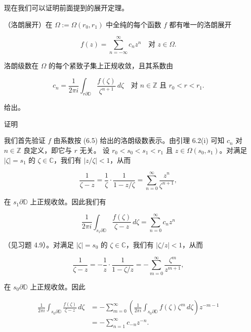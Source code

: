 现在我们可以证明前面提到的展开定理。

\begin{theorem}

（洛朗展开）在 $ \Omega := \Omega(r_{0},r_{1}) $ 中全纯的每个函数 $ f $ 都有唯一的洛朗展开

\begin{equation}
f(z) = \sum_{n=-\infty}^{\infty} c_{n}z^{n} \quad\text{对 } z \in \Omega .\tag{6.4}
\end{equation}

洛朗级数在 $ \Omega $ 的每个紧致子集上正规收敛，且其系数由

\begin{equation}
c_{n} = \frac{1}{2\pi i}\int_{r\partial\mathbb{D}}\frac{f(\zeta)}{\zeta^{n+1}}\,d\zeta \quad\text{对 } n \in \mathbb{Z} \text{ 且 } r_{0} < r < r_{1} .\tag{6.5}
\end{equation}

给出。

证明

\begin{subitems}
\item

我们首先验证 $ f $ 由系数按 (6.5) 给出的洛朗级数表示。由引理 6.2(i) 可知 $ c_{n} $ 对 $ n \in \mathbb{Z} $ 良定义，即它与 $ r $ 无关。
设 $ r_{0} < s_{0} < s_{1} < r_{1} $ 且 $ z \in \Omega(s_{0},s_{1}) $。对满足 $ |\zeta| = s_{1} $ 的 $ \zeta \in \mathbb{C} $，我们有 $ |z/\zeta| < 1 $，从而

\[
\frac{1}{\zeta - z} = \frac{1}{\zeta}\cdot\frac{1}{1 - z/\zeta} = \sum_{n=0}^{\infty}\frac{z^{n}}{\zeta^{n+1}} ,
\]

在 $ s_{1}\partial\mathbb{D} $ 上正规收敛。因此我们有

\[
\frac{1}{2\pi i}\int_{s_{1}\partial\mathbb{D}}\frac{f(\zeta)}{\zeta - z}\,d\zeta = \sum_{n=0}^{\infty} c_{n}z^{n}
\]

（见习题 4.9）。对满足 $ |\zeta| = s_{0} $ 的 $ \zeta \in \mathbb{C} $，我们有 $ |\zeta/z| < 1 $，从而

\[
\frac{1}{\zeta - z} = -\frac{1}{z}\cdot\frac{1}{1 - \zeta/z} = -\sum_{m=0}^{\infty}\frac{\zeta^{m}}{z^{m+1}} ,
\]

在 $ s_{0}\partial\mathbb{D} $ 上正规收敛。因此

\begin{equation*}
\begin{aligned}
\frac{1}{2\pi i}\int_{s_{0}\partial\mathbb{D}}\frac{f(\zeta)}{\zeta - z}\,d\zeta &= -\sum_{m=0}^{\infty}\left(\frac{1}{2\pi i}\int_{s_{0}\partial\mathbb{D}} f(\zeta)\zeta^{m}\,d\zeta\right)z^{-m-1} \\ &= -\sum_{n=1}^{\infty} c_{-n}z^{-n} .
\end{aligned}
\end{equation*}


\end{subitems}
\end{theorem}

